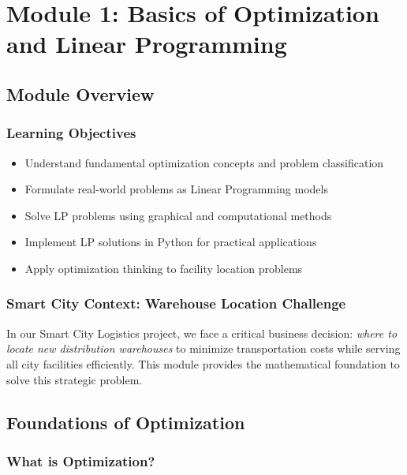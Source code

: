 \documentclass[
  letterpaper,
  DIV=11,
  numbers=noendperiod]{scrreprt}
\providecommand{\tightlist}{%
  \setlength{\itemsep}{0pt}\setlength{\parskip}{0pt}}
\begin{document}

\chapter{Module 1: Basics of Optimization and Linear
Programming}\label{module-1-basics-of-optimization-and-linear-programming}

\section{Module Overview}\label{module-overview}

\subsection{Learning Objectives}\label{learning-objectives}

\begin{itemize}
\tightlist
\item
  Understand fundamental optimization concepts and problem
  classification
\item
  Formulate real-world problems as Linear Programming models
\item
  Solve LP problems using graphical and computational methods
\item
  Implement LP solutions in Python for practical applications
\item
  Apply optimization thinking to facility location problems
\end{itemize}

\subsection{Smart City Context: Warehouse Location
Challenge}\label{smart-city-context-warehouse-location-challenge}

In our Smart City Logistics project, we face a critical business
decision: \emph{where to locate new distribution warehouses} to minimize
transportation costs while serving all city facilities efficiently. This
module provides the mathematical foundation to solve this strategic
problem.

\section{Foundations of Optimization}\label{foundations-of-optimization}

\subsection{What is Optimization?}\label{what-is-optimization}
\end{document}

